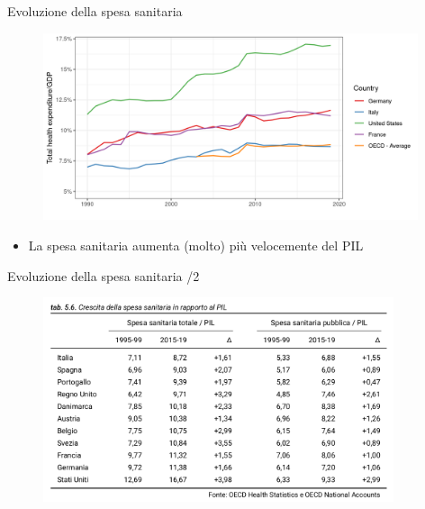 \documentclass[aspectratio=149,11pt]{beamer}
\begin{document}
\begin{frame}{Evoluzione della spesa sanitaria}
\begin{figure}[htbp]
\centering
\includegraphics[height=5.5cm]{./figure/health-expenditure-growth-OECD.png}
\end{figure}

\begin{itemize}
\item La spesa sanitaria aumenta (molto) più velocemente del PIL
\end{itemize}
\end{frame}

\begin{frame}{Evoluzione della spesa sanitaria /2}
\begin{figure}[htbp]
\centering
\includegraphics[height=6cm]{./figure/crescita-spesa-sanitaria.png}
\end{figure}
\end{frame}
\end{document}
